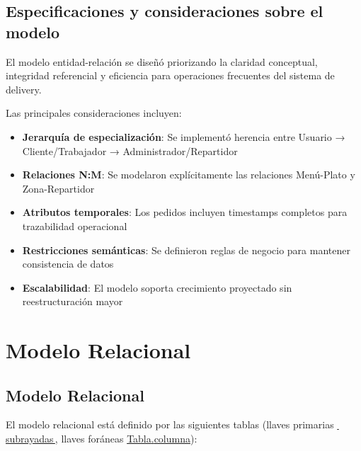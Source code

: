 \documentclass[12pt,a4paper]{article}
\newcommand{\relname}[1]{\textcolor{green!60!black}{#1}}
\newcommand{\attr}[1]{\textcolor{blue!70!black}{#1}}
\newcommand{\pk}[1]{\uline{\textcolor{green!60!black}{#1}}}
\newcommand{\fk}[2]{\uline{\relname{#1}.\attr{#2}}}
\begin{document}
\subsection{Especificaciones y consideraciones sobre el modelo}
El modelo entidad-relación se diseñó priorizando la claridad conceptual, integridad referencial y eficiencia para operaciones frecuentes del sistema de delivery. 

Las principales consideraciones incluyen:
\begin{itemize}
    \item \textbf{Jerarquía de especialización}: Se implementó herencia entre Usuario → Cliente/Trabajador → Administrador/Repartidor
    \item \textbf{Relaciones N:M}: Se modelaron explícitamente las relaciones Menú-Plato y Zona-Repartidor
    \item \textbf{Atributos temporales}: Los pedidos incluyen timestamps completos para trazabilidad operacional
    \item \textbf{Restricciones semánticas}: Se definieron reglas de negocio para mantener consistencia de datos
    \item \textbf{Escalabilidad}: El modelo soporta crecimiento proyectado sin reestructuración mayor
\end{itemize}

\section{Modelo Relacional}

\subsection{Modelo Relacional}
El modelo relacional está definido por las siguientes tablas  
(llaves primarias \pk{\,subrayadas\,}, llaves foráneas \fk{Tabla}{columna}):
\end{document}
